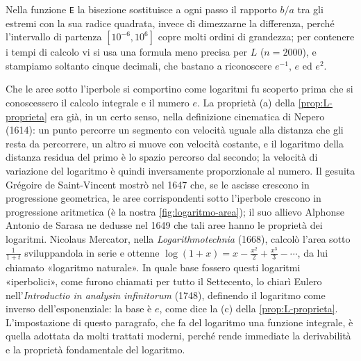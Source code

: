 Nella funzione \texttt{E} la bisezione sostituisce a ogni passo il rapporto $b/a$ tra gli
estremi con la sua radice quadrata, invece di dimezzarne la differenza, perché l'intervallo di partenza $[10^{-6},10^{6}]$ copre
molti ordini di grandezza; per contenere i tempi di calcolo vi si usa una formula meno
precisa per $L$ ($n=2000$), e stampiamo soltanto cinque decimali, che bastano a
riconoscere $e^{-1}$, $e$ ed $e^{2}$.

\begin{notastorica}
Che le aree sotto l'iperbole si comportino come logaritmi fu scoperto prima che si
conoscessero il calcolo integrale e il numero $e$. La proprietà (a)
della \cref{prop:L-proprieta} era già, in un certo senso, nella definizione cinematica di
Nepero (1614): un punto percorre un segmento con velocità uguale alla distanza che gli
resta da percorrere, un altro si muove con velocità costante, e il logaritmo della
distanza residua del primo è lo spazio percorso dal secondo; la velocità di variazione
del logaritmo è quindi inversamente proporzionale al numero. Il gesuita Grégoire de Saint-Vincent
mostrò nel 1647 che, se le ascisse crescono in progressione geometrica, le aree
corrispondenti sotto l'iperbole crescono in progressione aritmetica (è la nostra
\cref{fig:logaritmo-area}); il suo allievo Alphonse Antonio de Sarasa ne dedusse nel 1649
che tali aree hanno le proprietà dei logaritmi. Nicolaus Mercator, nella
\emph{Logarithmotechnia} (1668), calcolò l'area sotto $\frac1{1+t}$ sviluppandola in serie e
ottenne $\log(1+x)=x-\frac{x^{2}}2+\frac{x^{3}}3-\cdots$, da lui chiamato «logaritmo naturale».
In quale base fossero questi logaritmi «iperbolici», come furono chiamati per tutto il
Settecento, lo chiarì Eulero nell'\emph{Introductio in analysin infinitorum} (1748),
definendo il logaritmo come inverso dell'esponenziale: la base è $e$, come dice la (c)
della \cref{prop:L-proprieta}.
L'impostazione di questo paragrafo, che fa del logaritmo una funzione integrale, è
quella adottata da molti trattati moderni, perché rende immediate la derivabilità e la
proprietà fondamentale del logaritmo.
\end{notastorica}
